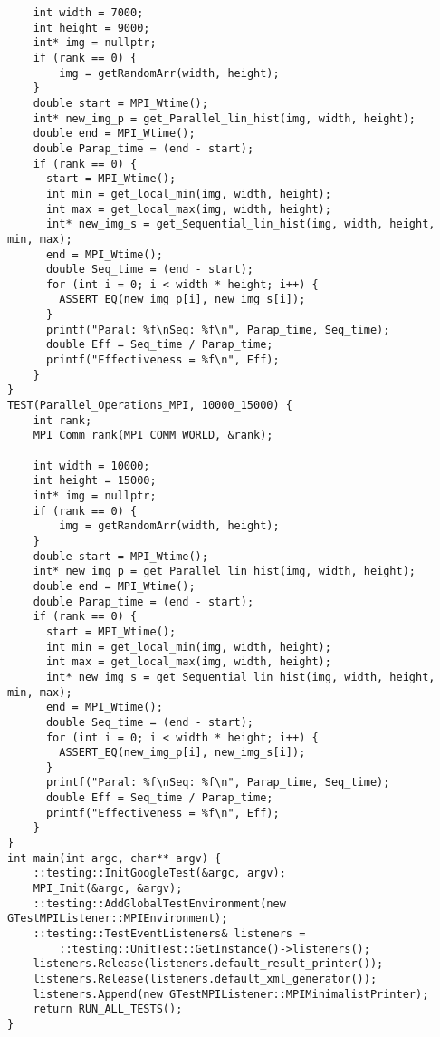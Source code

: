 \documentclass{report}
\begin{document}
\begin{lstlisting}
    int width = 7000;
    int height = 9000;
    int* img = nullptr;
    if (rank == 0) {
        img = getRandomArr(width, height);
    }
    double start = MPI_Wtime();
    int* new_img_p = get_Parallel_lin_hist(img, width, height);
    double end = MPI_Wtime();
    double Parap_time = (end - start);
    if (rank == 0) {
      start = MPI_Wtime();
      int min = get_local_min(img, width, height);
      int max = get_local_max(img, width, height);
      int* new_img_s = get_Sequential_lin_hist(img, width, height, min, max);
      end = MPI_Wtime();
      double Seq_time = (end - start);
      for (int i = 0; i < width * height; i++) {
        ASSERT_EQ(new_img_p[i], new_img_s[i]);
      }
      printf("Paral: %f\nSeq: %f\n", Parap_time, Seq_time);
      double Eff = Seq_time / Parap_time;
      printf("Effectiveness = %f\n", Eff);
    }
}
TEST(Parallel_Operations_MPI, 10000_15000) {
    int rank;
    MPI_Comm_rank(MPI_COMM_WORLD, &rank);

    int width = 10000;
    int height = 15000;
    int* img = nullptr;
    if (rank == 0) {
        img = getRandomArr(width, height);
    }
    double start = MPI_Wtime();
    int* new_img_p = get_Parallel_lin_hist(img, width, height);
    double end = MPI_Wtime();
    double Parap_time = (end - start);
    if (rank == 0) {
      start = MPI_Wtime();
      int min = get_local_min(img, width, height);
      int max = get_local_max(img, width, height);
      int* new_img_s = get_Sequential_lin_hist(img, width, height, min, max);
      end = MPI_Wtime();
      double Seq_time = (end - start);
      for (int i = 0; i < width * height; i++) {
        ASSERT_EQ(new_img_p[i], new_img_s[i]);
      }
      printf("Paral: %f\nSeq: %f\n", Parap_time, Seq_time);
      double Eff = Seq_time / Parap_time;
      printf("Effectiveness = %f\n", Eff);
    }
}
int main(int argc, char** argv) {
    ::testing::InitGoogleTest(&argc, argv);
    MPI_Init(&argc, &argv);
    ::testing::AddGlobalTestEnvironment(new GTestMPIListener::MPIEnvironment);
    ::testing::TestEventListeners& listeners =
        ::testing::UnitTest::GetInstance()->listeners();
    listeners.Release(listeners.default_result_printer());
    listeners.Release(listeners.default_xml_generator());
    listeners.Append(new GTestMPIListener::MPIMinimalistPrinter);
    return RUN_ALL_TESTS();
}

\end{lstlisting}
\end{document}
